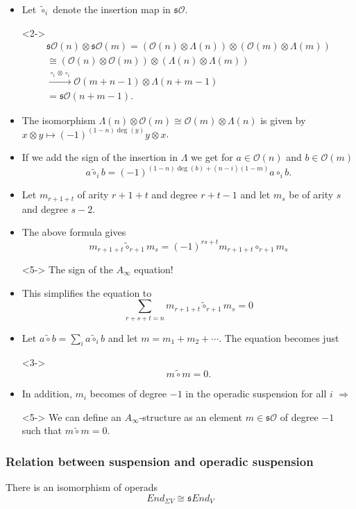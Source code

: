 \documentclass{beamer}
\theoremstyle{definition}
\begin{document}
\begin{frame}
\begin{itemize}
\item<1-> Let $\tilde{\circ}_i$ denote the insertion map in $\mathfrak{s}\mathcal{O}$.
\item[]<2-> \begin{align*}
\mathfrak{s}\mathcal{O}(n)\otimes\mathfrak{s}\mathcal{O}(m)=(\mathcal{O}(n)\otimes\Lambda(n))\otimes (\mathcal{O}(m)\otimes\Lambda(m))\\
\cong (\mathcal{O}(n)\otimes \mathcal{O}(m))\otimes (\Lambda(n)\otimes \Lambda(m))\\
\xrightarrow{\circ_i\otimes\circ_i} \mathcal{O}(m+n-1)\otimes \Lambda(n+m-1)\\=\mathfrak{s}\mathcal{O}(n+m-1).
\end{align*}
\end{itemize}
\end{frame}
\begin{frame}
\begin{itemize}
\item<1-> The isomorphism $\Lambda(n)\otimes \mathcal{O}(m)\cong \mathcal{O}(m)\otimes \Lambda(n)$ is given by $x\otimes y\mapsto (-1)^{(1-n)\deg(y)}y\otimes x$.
\item<2-> If we add the sign of the insertion in $\Lambda$ we get for $a\in\mathcal{O}(n)$ and $b\in\mathcal{O}(m)$
\[a\tilde{\circ}_ib=(-1)^{(1-n)\deg(b)+(n-i)(1-m)}a\circ_i b.\]
\item<3-> Let $m_{r+1+t}$ of arity $r+1+t$ and degree $r+t-1$ and let $m_s$ be of arity $s$ and degree $s-2$. %
\item<4-> The above formula gives 
\[m_{r+1+t}\tilde{\circ}_{r+1}m_s=(-1)^{rs+t}m_{r+1+t}\circ_{r+1}m_s\]
\item[]<5-> The sign of the $A_\infty$ equation!
\end{itemize}
\end{frame}

\begin{frame}
\begin{itemize}
\item<1-> This simplifies the equation to
\[\sum_{r+s+t=n}m_{r+1+t}\tilde{\circ}_{r+1}m_s=0\] %
\item<2-> Let $a\tilde{\circ}b=\sum_{i}a\tilde{\circ}_ib$ and let $m=m_1+m_2+\cdots$. The equation becomes just
\item[]<3-> \[m\tilde{\circ}m=0.\]
\item<4-> In addition, $m_i$ becomes of degree $-1$ in the operadic suspension for all $i$ $\Rightarrow$
\item[]<5-> We can define an $A_\infty$-structure as an element $m\in\mathfrak{s}\mathcal{O}$ of degree $-1$ such that $m\tilde{\circ}m=0$. 
\end{itemize}
\end{frame}
\begin{frame}
\frametitle{Relation between suspension and operadic suspension}
\begin{theorem}[Markl]
There is an isomorphism of operads
\[End_{\Sigma V}\cong \mathfrak{s}End_V\]
\end{theorem}
\end{frame}
\end{document}

